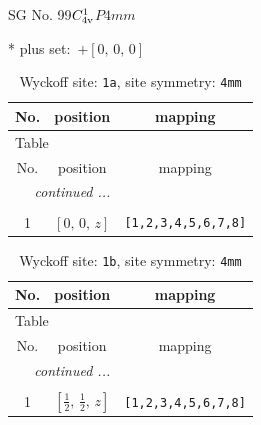 \documentclass[fleqn,8pt]{jsarticle}
\begin{document}
\setcounter{MaxMatrixCols}{32}

\renewcommand{\tablename}{Table~}
\renewcommand{\figurename}{Figure~}
\begin{center}
\LARGE
SG No. 99\quad$C_{\rm 4v}^{1}$\quad$P4mm$\quad[ tetragonal ]
\end{center}
* plus set:\,\,\,$+\left[ 0,\, 0,\, 0 \right]$
\renewcommand{\arraystretch}{1.2}
\begin{longtable}{ccc}
\caption{Wyckoff site: {\tt 1a}, site symmetry: {\tt 4mm}}
 \\
 \hline \hline
No. & position & mapping \\ \hline \endfirsthead

\multicolumn{2}{l}{\tablename\ \thetable{}} \\
 \hline \hline
No. & position & mapping \\ \hline \endhead

 \hline \hline
\multicolumn{2}{r}{\footnotesize\it continued ...} \\ \endfoot

 \hline \hline
\multicolumn{2}{r}{} \\ \endlastfoot

1 & $\left[ 0,\, 0,\, z \right]$ & {\tt [1,2,3,4,5,6,7,8]} \\
\end{longtable}
\renewcommand{\arraystretch}{1.2}
\begin{longtable}{ccc}
\caption{Wyckoff site: {\tt 1b}, site symmetry: {\tt 4mm}}
 \\
 \hline \hline
No. & position & mapping \\ \hline \endfirsthead

\multicolumn{2}{l}{\tablename\ \thetable{}} \\
 \hline \hline
No. & position & mapping \\ \hline \endhead

 \hline \hline
\multicolumn{2}{r}{\footnotesize\it continued ...} \\ \endfoot

 \hline \hline
\multicolumn{2}{r}{} \\ \endlastfoot

1 & $\left[ \frac{1}{2},\, \frac{1}{2},\, z \right]$ & {\tt [1,2,3,4,5,6,7,8]} \\
\end{longtable}
\renewcommand{\arraystretch}{1.2}
\end{document}
